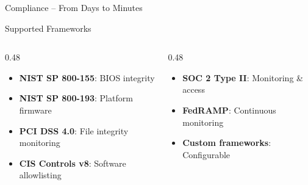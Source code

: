 \begin{frame}{Compliance -- From Days to Minutes}
  \begin{block}{Supported Frameworks}
    \scriptsize
    \begin{columns}[T]
      \begin{column}{0.48\textwidth}
        \begin{itemize}
          \item \textbf{NIST SP 800-155}: BIOS integrity
          \item \textbf{NIST SP 800-193}: Platform firmware
          \item \textbf{PCI DSS 4.0}: File integrity monitoring
          \item \textbf{CIS Controls v8}: Software allowlisting
        \end{itemize}
      \end{column}
      \begin{column}{0.48\textwidth}
        \begin{itemize}
          \item \textbf{SOC 2 Type II}: Monitoring \& access
          \item \textbf{FedRAMP}: Continuous monitoring
          \item \textbf{Custom frameworks}: Configurable
        \end{itemize}
      \end{column}
    \end{columns}
  \end{block}
\end{frame}
